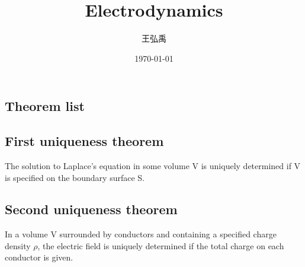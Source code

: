 \documentclass[12pt, a4paper]{article}
\title{\textbf{Electrodynamics}}
\author{王弘禹}
\date\today
\begin{document}
\begin{CJK*}{UTF8}{bsmi}
\linespread{1.5}
\maketitle
\newcommand{\st}[1]{\section*{#1}}
\newcommand{\sst}[1]{\subsection*{#1}}
\newcommand{\ssst}[1]{\subsubsection*{#1}}
\newcommand{\dsp}{\displaystyle}
\newcommand{\dx}{\,dx}
\newcommand{\dphi}{\,d\phi}
\newcommand{\dtheta}{\,d\theta}
\newcommand{\dy}{\,dy}
\newcommand{\dz}{\,dz}
\newcommand{\dr}{\,dr}
\newcommand{\drho}{\,d\rho}
\newcommand{\tb}{\textbf}
\st{Theorem list}
\sst{First uniqueness theorem}
The solution to Laplace's equation in some volume V is uniquely determined if V is specified on the boundary surface S.
\sst{Second uniqueness theorem}
In a volume V surrounded by conductors and containing a specified charge density \(\rho\), the electric field is uniquely determined if the total charge on each conductor is given.
\end{CJK*}
\end{document}

